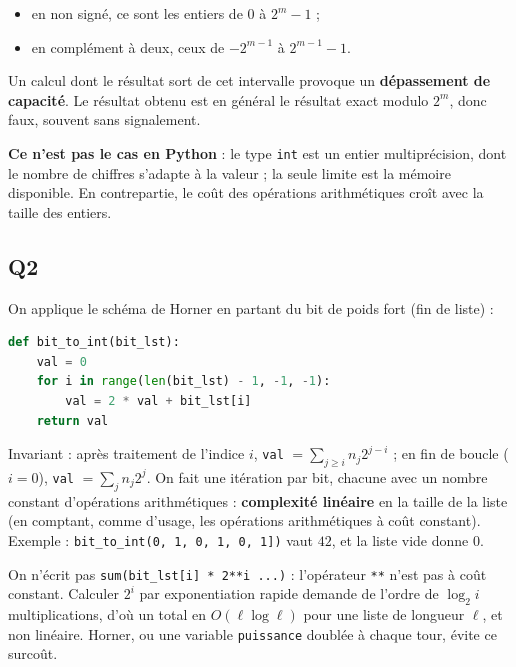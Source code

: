 \documentclass[11pt,a4paper]{article}
\providecommand{\tightlist}{\setlength{\itemsep}{0pt}\setlength{\parskip}{0pt}}
\begin{document}
\begin{itemize}
\tightlist
\item
  en non signé, ce sont les entiers de \(0\) à \(2^m - 1\) ;
\item
  en complément à deux, ceux de \(-2^{m-1}\) à \(2^{m-1}-1\).
\end{itemize}

Un calcul dont le résultat sort de cet intervalle provoque un \textbf{dépassement de capacité}. Le résultat obtenu est en général le résultat exact modulo \(2^m\), donc faux, souvent sans signalement.

\textbf{Ce n'est pas le cas en Python} : le type \texttt{int} est un entier multiprécision, dont le nombre de chiffres s'adapte à la valeur ; la seule limite est la mémoire disponible. En contrepartie, le coût des opérations arithmétiques croît avec la taille des entiers.

\hypertarget{q2}{%
\subsection{Q2}\label{q2}}

On applique le schéma de Horner en partant du bit de poids fort (fin de liste) :

\begin{lstlisting}[language=Python]
def bit_to_int(bit_lst):
    val = 0
    for i in range(len(bit_lst) - 1, -1, -1):
        val = 2 * val + bit_lst[i]
    return val
\end{lstlisting}

Invariant : après traitement de l'indice \(i\), \texttt{val} \(= \sum_{j \ge i} n_j 2^{j-i}\) ; en fin de boucle (\(i = 0\)), \texttt{val} \(= \sum_j n_j 2^j\). On fait une itération par bit, chacune avec un nombre constant d'opérations arithmétiques : \textbf{complexité linéaire} en la taille de la liste (en comptant, comme d'usage, les opérations arithmétiques à coût constant). Exemple : \texttt{bit\_to\_int(\allowbreak{}{[}0,\allowbreak{}\ 1,\allowbreak{}\ 0,\allowbreak{}\ 1,\allowbreak{}\ 0,\allowbreak{}\ 1{]}\allowbreak{})\allowbreak{}} vaut \(42\), et la liste vide donne \(0\).

On n'écrit pas \texttt{sum(\allowbreak{}bit\_lst{[}i{]}\allowbreak{}\ *\ 2**i\ ...)\allowbreak{}} : l'opérateur \texttt{**} n'est pas à coût constant. Calculer \(2^i\) par exponentiation rapide demande de l'ordre de \(\log_2 i\) multiplications, d'où un total en \(O(\ell \log \ell)\) pour une liste de longueur \(\ell\), et non linéaire. Horner, ou une variable \texttt{puissance} doublée à chaque tour, évite ce surcoût.
\end{document}
